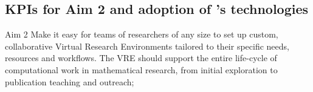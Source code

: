 \subsection{KPIs for Aim 2 and adoption of \ODK's technologies}

\begin{recommendation}{Aim 2}
  Make it easy for teams of researchers of any size to set up custom,
  collaborative Virtual Research Environments tailored to their
  specific needs, resources and workflows. The VRE should support the
  entire life-cycle of computational work in mathematical research,
  from initial exploration to publication teaching and outreach;
\end{recommendation}


